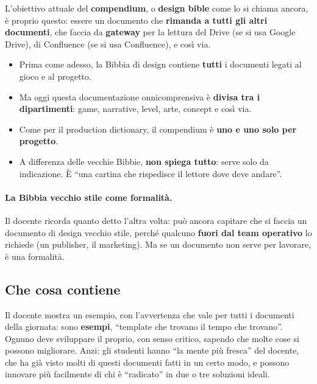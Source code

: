 L'obiettivo attuale del \textbf{compendium}, o \textbf{design bible} come lo
si chiama ancora, è proprio questo: essere un documento che \textbf{rimanda a
tutti gli altri documenti}, che faccia da \textbf{gateway} per la lettura
del Drive (se si usa Google Drive), di Confluence (se si usa Confluence), e
così via.
\begin{itemize}
  \item Prima come adesso, la Bibbia di design contiene \textbf{tutti} i
        documenti legati al gioco e al progetto.
  \item Ma oggi questa documentazione onnicomprensiva è \textbf{divisa tra i
        dipartimenti}: game, narrative, level, arte, concept e così via.
  \item Come per il production dictionary, il compendium è \textbf{uno e uno
        solo per progetto}.
  \item A differenza delle vecchie Bibbie, \textbf{non spiega tutto}: serve
        solo da indicazione. È ``una cartina che rispedisce il lettore dove
        deve andare''.
\end{itemize}

\paragraph{La Bibbia vecchio stile come formalità.} Il docente ricorda quanto
detto l'altra volta: può ancora capitare che si faccia un documento di design
vecchio stile, perché qualcuno \textbf{fuori dal team operativo} lo richiede
(un publisher, il marketing). Ma se un documento non serve per lavorare, è
una formalità.

\subsection{Che cosa contiene}

Il docente mostra un esempio, con l'avvertenza che vale per tutti i documenti
della giornata: sono \textbf{esempi}, ``template che trovano il tempo che
trovano''. Ognuno deve sviluppare il proprio, con senso critico, sapendo che
molte cose si possono migliorare. Anzi: gli studenti hanno ``la mente più
fresca'' del docente, che ha già visto molti di questi documenti fatti in un
certo modo, e possono innovare più facilmente di chi è ``radicato'' in due o
tre soluzioni ideali.

